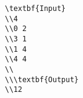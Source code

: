 \begin{verbatim}
\textbf{Input}
\\4 
\\0 2 
\\3 1 
\\1 4 
\\4 4 
\\
\\\textbf{Output}
\\12\end{verbatim}